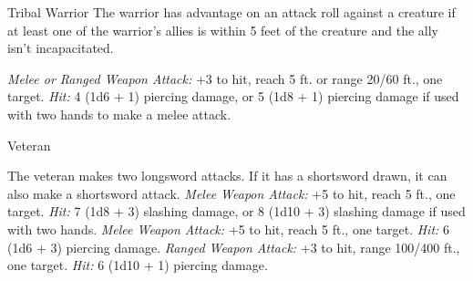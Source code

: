 \documentclass[10pt,a4paper,twoside,twocolumn,openany,bg=print,nodeprecatedcode]{dndbook}
\begin{document}
\begin{DndMonster}[float*=t]{Tribal Warrior}
\DndMonsterBasics[
armor-class = {12 (hide armor)},
hit-points = {\DndDice{2d8 + 2}},
speed = {30 ft.}
]
\DndMonsterAbilityScores[
 str = 13,
 dex = 11,
 con = 12,
 int = 8,
 wis = 11,
 cha = 8
]
\DndMonsterDetails[
languages = {any one language},
challenge = 1/8,
]
The warrior has advantage on an attack roll against a creature if at least one of the warrior's allies is within 5 feet of the creature and the ally isn't incapacitated.
\par
{}
\textsl{Melee or Ranged Weapon Attack:} +3 to hit, reach 5 ft. or range 20/60 ft., one target. \textsl{Hit:} 4 (1d6 + 1) piercing damage, or 5 (1d8 + 1) piercing damage if used with two hands to make a melee attack.
\end{DndMonster}



\begin{DndMonster}[float*=t]{Veteran}
\DndMonsterBasics[
armor-class = {17 (splint armor)},
hit-points = {\DndDice{9d8 + 18}},
speed = {30 ft.}
]
\DndMonsterAbilityScores[
 str = 16,
 dex = 13,
 con = 14,
 int = 10,
 wis = 11,
 cha = 10
]
\DndMonsterDetails[
skills = {Athletics +5, Perception +2},
languages = {any one language (usually Common)},
challenge = 3,
]
\par
{}
The veteran makes two longsword attacks. If it has a shortsword drawn, it can also make a shortsword attack.
\textsl{Melee Weapon Attack:} +5 to hit, reach 5 ft., one target. \textsl{Hit:} 7 (1d8 + 3) slashing damage, or 8 (1d10 + 3) slashing damage if used with two hands.
\textsl{Melee Weapon Attack:} +5 to hit, reach 5 ft., one target. \textsl{Hit:} 6 (1d6 + 3) piercing damage.
\textsl{Ranged Weapon Attack:} +3 to hit, range 100/400 ft., one target. \textsl{Hit:} 6 (1d10 + 1) piercing damage.
\end{DndMonster}
\end{document}
